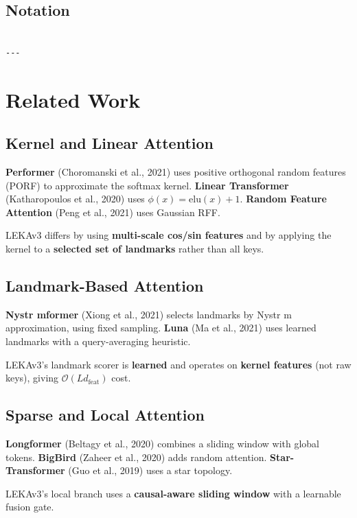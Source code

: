 \subsection{Notation}

\begin{lstlisting}

---
\end{lstlisting}

\section{Related Work}

\subsection{Kernel and Linear Attention}

\textbf{Performer} (Choromanski et al., 2021) uses positive orthogonal random 
features (PORF) to approximate the softmax kernel. \textbf{Linear Transformer} 
(Katharopoulos et al., 2020) uses $\phi(x) = \text{elu}(x) + 1$. 
\textbf{Random Feature Attention} (Peng et al., 2021) uses Gaussian RFF.

LEKAv3 differs by using \textbf{multi-scale cos/sin features} and by applying 
the kernel to a \textbf{selected set of landmarks} rather than all keys.

\subsection{Landmark-Based Attention}

\textbf{Nystr mformer} (Xiong et al., 2021) selects landmarks by Nystr m 
approximation, using fixed sampling. \textbf{Luna} (Ma et al., 2021) uses 
learned landmarks with a query-averaging heuristic.

LEKAv3's landmark scorer is \textbf{learned} and operates on \textbf{kernel features} 
(not raw keys), giving $\mathcal{O}(L d_\text{feat})$ cost.

\subsection{Sparse and Local Attention}

\textbf{Longformer} (Beltagy et al., 2020) combines a sliding window with global 
tokens. \textbf{BigBird} (Zaheer et al., 2020) adds random attention. 
\textbf{Star-Transformer} (Guo et al., 2019) uses a star topology.

LEKAv3's local branch uses a \textbf{causal-aware sliding window} with a learnable 
fusion gate.

